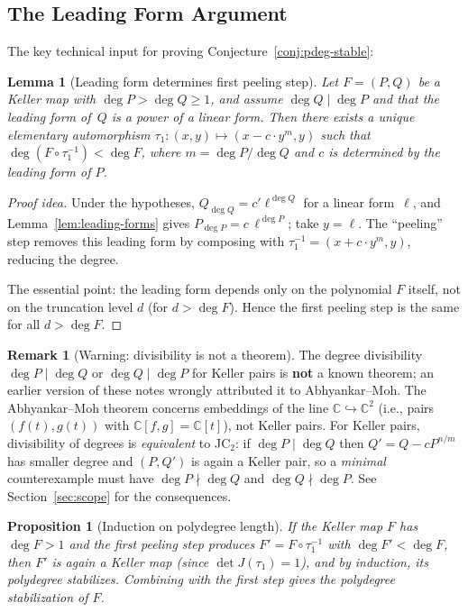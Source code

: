 \documentclass[12pt,a4paper]{article}
\newtheorem{proposition}[theorem]{Proposition}
\newtheorem{lemma}[theorem]{Lemma}
\theoremstyle{definition}
\newtheorem{remark}[theorem]{Remark}
\newcommand{\CC}{\mathbb{C}}
\begin{document}
\subsection{The Leading Form Argument}

The key technical input for proving Conjecture~\ref{conj:pdeg-stable}:

\begin{lemma}[Leading form determines first peeling step]
Let $F = (P, Q)$ be a Keller map with $\deg P > \deg Q \geq 1$, and
\emph{assume} $\deg Q \mid \deg P$ and that the leading form of~$Q$ is
a power of a linear form. Then there exists
a unique elementary automorphism $\tau_1: (x, y) \mapsto (x - c \cdot y^m, y)$ such
that $\deg(F \circ \tau_1^{-1}) < \deg F$, where $m = \deg P / \deg Q$ and
$c$ is determined by the leading form of $P$.
\end{lemma}

\begin{proof}[Proof idea]
Under the hypotheses, $Q_{\deg Q} = c' \ell^{\deg Q}$ for a linear form~$\ell$,
and Lemma~\ref{lem:leading-forms} gives $P_{\deg P} = c\,\ell^{\deg P}$;
take $y = \ell$. The ``peeling'' step removes this leading form by composing
with $\tau_1^{-1} = (x + c \cdot y^m, y)$, reducing the degree.

The essential point: the leading form depends only on the polynomial $F$ itself, not on
the truncation level $d$ (for $d > \deg F$). Hence the first peeling step is the same
for all $d > \deg F$.
\end{proof}

\begin{remark}[Warning: divisibility is not a theorem]\label{rem:div-not-thm}
The degree divisibility $\deg P \mid \deg Q$ or $\deg Q \mid \deg P$
for Keller pairs is \textbf{not} a known theorem; an earlier version of
these notes wrongly attributed it to Abhyankar--Moh. The Abhyankar--Moh
theorem concerns embeddings of the line $\CC \hookrightarrow \CC^2$
(i.e., pairs $(f(t), g(t))$ with $\CC[f,g] = \CC[t]$), not Keller pairs.
For Keller pairs, divisibility of degrees is \emph{equivalent} to JC$_2$:
if $\deg P \mid \deg Q$ then $Q' = Q - cP^{n/m}$ has smaller degree and
$(P, Q')$ is again a Keller pair, so a \emph{minimal} counterexample
must have $\deg P \nmid \deg Q$ and $\deg Q \nmid \deg P$.
See Section~\ref{sec:scope} for the consequences.
\end{remark}

\begin{proposition}[Induction on polydegree length]
If the Keller map $F$ has $\deg F > 1$ and the first peeling step produces
$F' = F \circ \tau_1^{-1}$ with $\deg F' < \deg F$, then $F'$ is again a Keller map
(since $\det J(\tau_1) = 1$), and by induction, its polydegree stabilizes.
Combining with the first step gives the polydegree stabilization of $F$.
\end{proposition}
\end{document}
